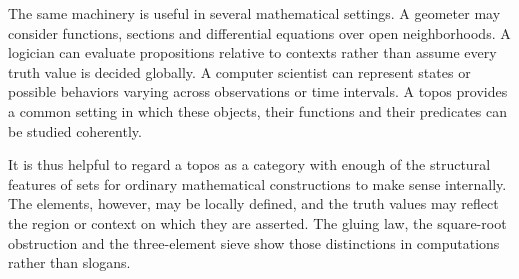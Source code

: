 The same machinery is useful in several mathematical settings. A geometer may consider functions, sections and differential equations over open neighborhoods. A logician can evaluate propositions relative to contexts rather than assume every truth value is decided globally. A computer scientist can represent states or possible behaviors varying across observations or time intervals. A topos provides a common setting in which these objects, their functions and their predicates can be studied coherently.

It is thus helpful to regard a topos as a category with enough of the structural features of sets for ordinary mathematical constructions to make sense internally. The elements, however, may be locally defined, and the truth values may reflect the region or context on which they are asserted. The gluing law, the square-root obstruction and the three-element sieve show those distinctions in computations rather than slogans.
